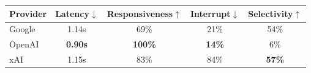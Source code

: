 \begin{tabular}{@{}lcccc@{}}
\toprule
\textbf{Provider} & \textbf{Latency}$\downarrow$ & \textbf{Responsiveness}$\uparrow$ & \textbf{Interrupt}$\downarrow$ & \textbf{Selectivity}$\uparrow$ \\
\midrule
Google & 1.14s & 69\% & 21\% & 54\% \\
OpenAI & \textbf{0.90s} & \textbf{100\%} & \textbf{14\%} & 6\% \\
xAI & 1.15s & 83\% & 84\% & \textbf{57\%} \\
\bottomrule
\end{tabular}
